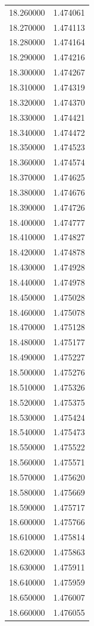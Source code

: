\begin{tabular}{rr}
18.260000 & 1.474061 \\
18.270000 & 1.474113 \\
18.280000 & 1.474164 \\
18.290000 & 1.474216 \\
18.300000 & 1.474267 \\
18.310000 & 1.474319 \\
18.320000 & 1.474370 \\
18.330000 & 1.474421 \\
18.340000 & 1.474472 \\
18.350000 & 1.474523 \\
18.360000 & 1.474574 \\
18.370000 & 1.474625 \\
18.380000 & 1.474676 \\
18.390000 & 1.474726 \\
18.400000 & 1.474777 \\
18.410000 & 1.474827 \\
18.420000 & 1.474878 \\
18.430000 & 1.474928 \\
18.440000 & 1.474978 \\
18.450000 & 1.475028 \\
18.460000 & 1.475078 \\
18.470000 & 1.475128 \\
18.480000 & 1.475177 \\
18.490000 & 1.475227 \\
18.500000 & 1.475276 \\
18.510000 & 1.475326 \\
18.520000 & 1.475375 \\
18.530000 & 1.475424 \\
18.540000 & 1.475473 \\
18.550000 & 1.475522 \\
18.560000 & 1.475571 \\
18.570000 & 1.475620 \\
18.580000 & 1.475669 \\
18.590000 & 1.475717 \\
18.600000 & 1.475766 \\
18.610000 & 1.475814 \\
18.620000 & 1.475863 \\
18.630000 & 1.475911 \\
18.640000 & 1.475959 \\
18.650000 & 1.476007 \\
18.660000 & 1.476055 \\

\end{tabular}
